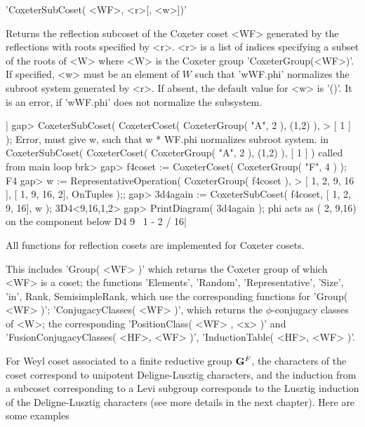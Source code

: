 
'CoxeterSubCoset( <WF>, <r>[, <w>])'

Returns the  reflection subcoset of  the Coxeter  coset <WF> generated by
the  reflections with roots  specified by <r>.  <r> is  a list of indices
specifying a subset  of the roots of <W>  where <W> is the  Coxeter group
'CoxeterGroup(<WF>)'.  If specified,  <w> must be  an element of $W$ such
that 'w\*WF.phi'  normalizes the subroot system  generated by <r>.  If
absent,   the  default value   for  <w>  is '()'.   It    is an error, if
'w\*WF.phi' does not normalize the subsystem.

|    gap> CoxeterSubCoset( CoxeterCoset( CoxeterGroup( "A", 2 ), (1,2) ),
    >                                                              [ 1 ] );
    Error, must give w, such that w * WF.phi normalizes subroot system.
     in
    CoxeterSubCoset( CoxeterCoset( CoxeterGroup( "A", 2 ), (1,2) ), [ 1 ]
     ) called from
    main loop
    brk>
    gap> f4coset := CoxeterCoset( CoxeterGroup( "F", 4 ) );
    F4
    gap> w := RepresentativeOperation( CoxeterGroup( f4coset ),
    >                      [ 1, 2, 9, 16 ], [ 1, 9, 16, 2], OnTuples );;
    gap> 3d4again := CoxeterSubCoset( f4coset, [ 1, 2, 9, 16], w );
    3D4<9,16,1,2>
    gap> PrintDiagram( 3d4again );
    phi acts as ( 2, 9,16) on the component below
    D4 9
        \
         1 - 2
        /
       16|

\Section{Functions on Coxeter cosets}

All functions for reflection cosets are implemented for Coxeter cosets.

This includes 'Group( <WF> )' which returns the Coxeter group of which <WF>
is  a coset; the functions  'Elements', 'Random', 'Representative', 'Size',
'in',  Rank,  SemisimpleRank,  which  use  the  corresponding functions for
'Group(   <WF>   )';   'ConjugacyClasses(   <WF>   )',  which  returns  the
$\phi$-conjugacy  classes of <W>; the  corresponding 'PositionClass( <WF> ,
<x>  )' and 'FusionConjugacyClasses( <HF>,  <WF> )', 'InductionTable( <HF>,
<WF> )'.

For  Weyl  coset  associated  to  a  finite  reductive  group  ${\bf G}^F$, the
characters of the coset correspond to unipotent Deligne-Lusztig characters,
and  the  induction  from  a  subcoset  corresponding  to  a  Levi subgroup
corresponds to the Lusztig induction of the Deligne-Lusztig characters (see
more details in the next chapter). Here are some examples\:\

